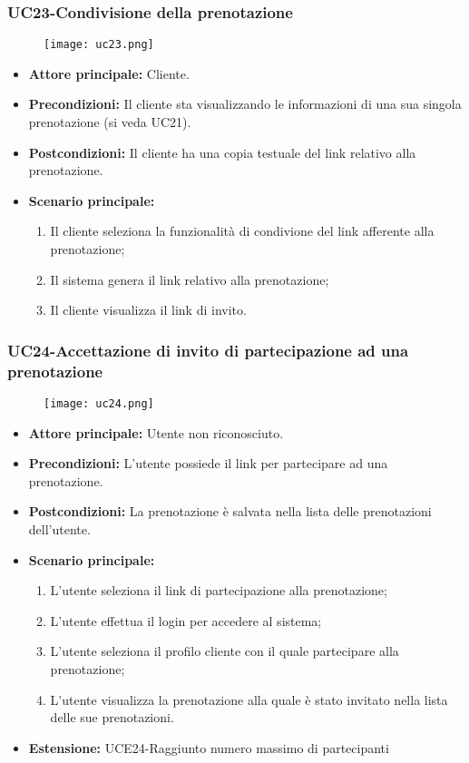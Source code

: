 \subsubsection{UC23-Condivisione della prenotazione}
\begin{figure}[h] \texttt{[image: uc23.png]} \end{figure}
\begin{itemize}
    \item \textbf{Attore principale: } Cliente.
    \item \textbf{Precondizioni: }Il cliente sta visualizzando le informazioni di una sua singola prenotazione (si veda UC21).
    \item \textbf{Postcondizioni: }Il cliente ha una copia testuale del link relativo alla prenotazione.
    \item \textbf{Scenario principale:}
        \begin{enumerate}
            \item Il cliente seleziona la funzionalità di condivione del link afferente alla prenotazione;
            \item Il sistema genera il link relativo alla prenotazione;
            \item Il cliente visualizza il link di invito.
        \end{enumerate}
\end{itemize}

\pagebreak
\subsubsection{UC24-Accettazione di invito di partecipazione ad una prenotazione}
\begin{figure}[h] \texttt{[image: uc24.png]} \end{figure}
\begin{itemize}
    \item \textbf{Attore principale:} Utente non riconosciuto.
    \item \textbf{Precondizioni: }L'utente possiede il link per partecipare ad una prenotazione.
    \item \textbf{Postcondizioni: }La prenotazione è salvata nella lista delle prenotazioni dell'utente.
    \item \textbf{Scenario principale:}
        \begin{enumerate}
            \item L'utente seleziona il link di partecipazione alla prenotazione;
            \item L'utente effettua il login per accedere al sistema;
            \item L'utente seleziona il profilo cliente con il quale partecipare alla prenotazione;
            \item L'utente visualizza la prenotazione alla quale è stato invitato nella lista delle sue
            prenotazioni.
        \end{enumerate}
        \item \textbf{Estensione: }UCE24-Raggiunto numero massimo di partecipanti
    \end{itemize}

